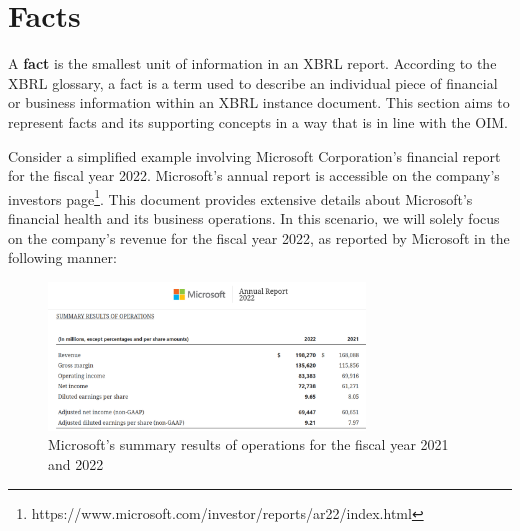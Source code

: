 \section{Facts}
\label{sec:facts}

A \textbf{fact} is the smallest unit of information in an XBRL report. 
According to the XBRL glossary, a fact is a term used to describe an individual piece of financial or business information within an XBRL instance document\cite{xbrl_glossary}.
This section aims to represent facts and its supporting concepts in a way that is in line with the OIM.

Consider a simplified example involving Microsoft Corporation's financial report for the fiscal year 2022.
Microsoft's annual report is accessible on the company's investors page\footnote{https://www.microsoft.com/investor/reports/ar22/index.html}.
This document provides extensive details about Microsoft's financial health and its business operations.
In this scenario, we will solely focus on the company's revenue for the fiscal year 2022,
as reported by Microsoft in the following manner:

\begin{figure}[H]
    \centering
    \includegraphics[width=0.75\textwidth]{images/microsoft_annual_report_2022.png}
\caption{Microsoft's summary results of operations for the fiscal year 2021 and 2022\cite{microsoft2022ar}}
    \label{fig:microsoft_annual_report_2022}
\end{figure}

